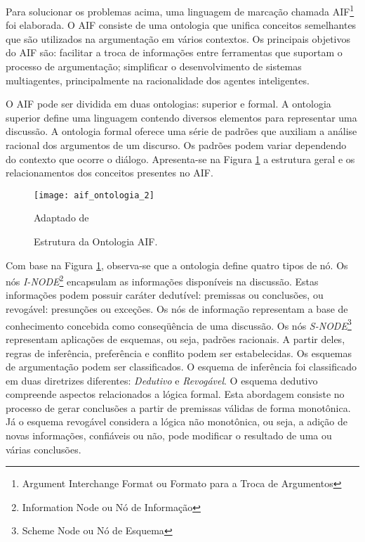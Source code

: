 Para solucionar os problemas acima, uma linguagem de marcação chamada AIF\footnote{Argument Interchange Format ou Formato para a Troca de Argumentos} \cite{rahwan2011} foi elaborada. O AIF consiste de uma ontologia que unifica conceitos semelhantes que são utilizados na argumentação em vários contextos. Os principais objetivos do AIF são: facilitar a troca de informações entre ferramentas que suportam o processo de argumentação; simplificar o desenvolvimento de sistemas multiagentes, principalmente na racionalidade dos agentes inteligentes. 
	
O AIF pode ser dividida em duas ontologias:  superior e formal. A ontologia superior define uma linguagem contendo diversos elementos para representar uma discussão. A ontologia formal oferece uma série de padrões que auxiliam a análise racional dos argumentos de um discurso.  Os padrões podem variar dependendo do contexto que ocorre o diálogo. Apresenta-se na Figura \ref{elementos-ontologia-aif} a estrutura geral e os relacionamentos dos conceitos presentes no AIF. 

\graphicspath{{figuras/}}
\begin{figure}[H]
\centering
\texttt{[image: aif\_ontologia\_2]}
\caption{Estrutura da Ontologia AIF.}{Adaptado de \cite{bex_formal_2010}} 
\label{elementos-ontologia-aif}
\end{figure}

Com base na Figura \ref{elementos-ontologia-aif}, observa-se que a ontologia define quatro tipos de nó. Os nós \textit{I-NODE}\footnote{Information Node ou Nó de Informação} encapsulam as informações disponíveis na discussão. Estas informações podem possuir caráter dedutível: premissas ou conclusões, ou revogável: presunções ou exceções. Os nós de informação representam a base de conhecimento concebida como conseqüência de uma discussão. Os nós \textit{S-NODE}\footnote{Scheme Node ou Nó de Esquema} representam aplicações de esquemas, ou seja, padrões racionais. A partir deles, regras de inferência, preferência e conflito podem ser estabelecidas. Os esquemas de argumentação podem ser classificados. O esquema de inferência foi classificado em duas diretrizes diferentes: \textit{Dedutivo} e \textit{Revogável}. O esquema dedutivo compreende aspectos relacionados a lógica formal. Esta abordagem consiste no processo de gerar conclusões a partir de premissas válidas de forma monotônica. Já o esquema revogável considera a lógica não monotônica, ou seja, a adição de novas informações, confiáveis ou não, pode modificar o resultado de uma ou várias conclusões. 

